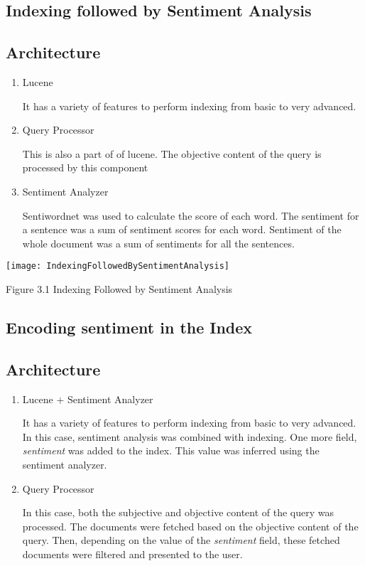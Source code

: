 \subsection{Indexing followed by Sentiment Analysis}

\subsection*{Architecture}

\begin{enumerate}
 \item Lucene
  \par It has a variety of features to perform indexing from basic to very advanced. 
 \item Query Processor
  \par This is also a part of of lucene. The objective content of the query is processed by this component
 \item Sentiment Analyzer
  \par Sentiwordnet \citep*{sentiwordnet} was used to calculate the score of each word. The sentiment for a sentence was a sum of sentiment scores
  for each word. Sentiment of the whole document was a sum of sentiments for all the sentences. 
\end{enumerate}

\texttt{[image: IndexingFollowedBySentimentAnalysis]}
\begin{center}
 Figure 3.1 Indexing Followed by Sentiment Analysis
\end{center}

\subsection{Encoding sentiment in the Index}

\subsection*{Architecture}

\begin{enumerate}
 \item Lucene + Sentiment Analyzer
  \par It has a variety of features to perform indexing from basic to very advanced. In this case, sentiment analysis was combined with
  indexing. One more field, \textit{sentiment} was added to the index. This value was inferred using the sentiment analyzer. 
 \item Query Processor
  \par In this case, both the subjective and objective content of the query was processed. The documents were fetched based on the objective
  content of the query. Then, depending on the value of the \textit{sentiment} field, these fetched documents were filtered and presented
  to the user.
\end{enumerate}

